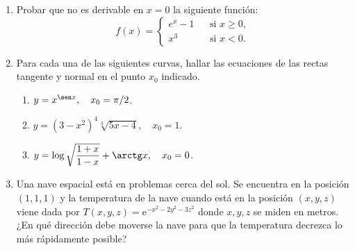 \begin{enumerate}[leftmargin=*]

\item  Probar que no es derivable en $x=0$ la siguiente función:
\[ f(x)=\left\{
\begin{array}{ccl}
    e^x-1 &  & \mbox{si } x\geq 0,  \\
    x^3 &  & \mbox{si } x<0.
\end{array}\right.
\]

\item  Para cada una de las siguientes curvas, hallar las ecuaciones
de las rectas tangente y normal en el punto $x_{0}$ indicado.
\begin{enumerate}
    \item  $y=x^{\sen x},\quad x_{0}=\pi/2$.

    \item  $y=(3-x^2)^4\sqrt[3]{5x-4},\quad x_{0}=1$.

    \item  $y=\log \sqrt{\dfrac{1+x}{1-x}}+\arctg x, \quad x_{0}=0$.
\end{enumerate}

\item Una nave espacial está en problemas cerca del sol. Se
encuentra en la posición $(1,1,1)$ y la temperatura de la nave cuando
está en la posición $(x,y,z)$ viene dada por
$T(x,y,z)=\mbox{e}^{-x^2-2y^2-3z^2}$ donde $x,y,z$ se miden en metros.
¿En qué dirección debe moverse la nave para que la temperatura decrezca
lo más rápidamente posible?
\end{enumerate}